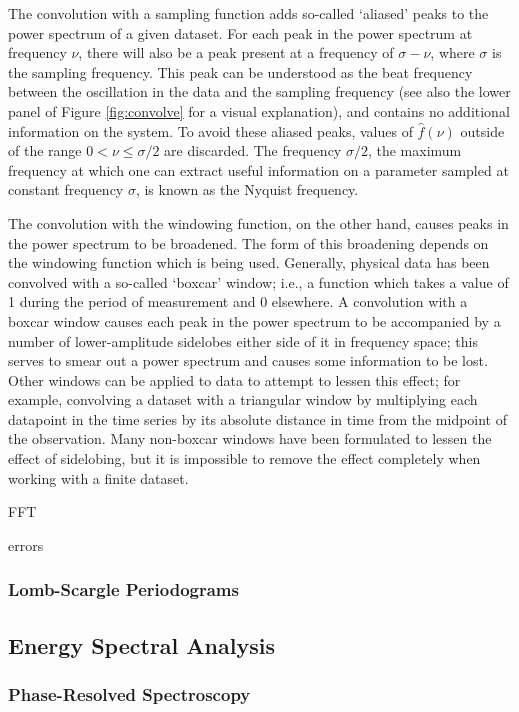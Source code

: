 \par The convolution with a sampling function adds so-called `aliased' peaks to the power spectrum of a given dataset.  For each peak in the power spectrum at frequency $\nu$, there will also be a peak present at a frequency of $\sigma-\nu$, where $\sigma$ is the sampling frequency.  This peak can be understood as the beat frequency between the oscillation in the data and the sampling frequency (see also the lower panel of Figure \ref{fig:convolve} for a visual explanation), and contains no additional information on the system.  To avoid these aliased peaks, values of $\hat{f}(\nu)$ outside of the range $0<\nu\leq\sigma/2$ are discarded.  The frequency $\sigma/2$, the maximum frequency at which one can extract useful information on a parameter sampled at constant frequency $\sigma$, is known as the Nyquist frequency.
\par The convolution with the windowing function, on the other hand, causes peaks in the power spectrum to be broadened.  The form of this broadening depends on the windowing function which is being used.  Generally, physical data has been convolved with a so-called `boxcar' window; i.e., a function which takes a value of 1 during the period of measurement and 0 elsewhere.  A convolution with a boxcar window causes each peak in the power spectrum to be accompanied by a number of lower-amplitude sidelobes either side of it in frequency space; this serves to smear out a power spectrum and causes some information to be lost.  Other windows can be applied to data to attempt to lessen this effect; for example, convolving a dataset with a triangular window by multiplying each datapoint in the time series by its absolute distance in time from the midpoint of the observation.  Many non-boxcar windows have been formulated to lessen the effect of sidelobing, but it is impossible to remove the effect completely when working with a finite dataset.
\par FFT
\par errors


\subsubsection{Lomb-Scargle Periodograms}

\subsection{Energy Spectral Analysis}

\subsubsection{Phase-Resolved Spectroscopy}
\label{sec:phasresspec}

